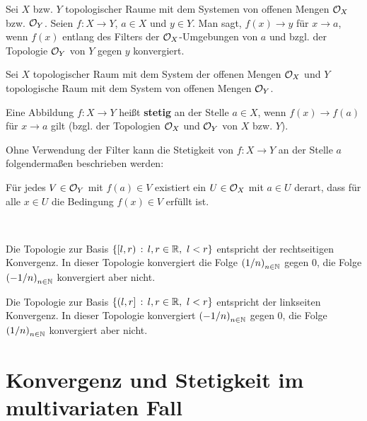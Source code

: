 \begin{defn}
	Sei $X$ bzw. $Y$ topologischer Raume mit dem Systemen von offenen Mengen $\mathcal{O}_X$ bzw. $\mathcal{O}_Y$. Seien $ f:  X \to Y$, $a \in X$ und $y \in Y$. Man sagt,  $f(x) \to y$ für $x \to a$, wenn $f(x)$ entlang des Filters der $\mathcal{O}_X$-Umgebungen von $a$ und bzgl. der Topologie $\mathcal{O}_Y$ von $Y$ gegen $y$ konvergiert. 
\end{defn} 

\begin{defn}
	Sei $X$ topologischer Raum mit dem System der offenen Mengen $\mathcal{O}_X$ und $Y$ topologische Raum mit dem System von offenen Mengen $\mathcal{O}_Y$. 
	
	Eine Abbildung $ f: X \to Y$ heißt \textbf{stetig} an der Stelle $a \in X$, wenn $f(x) \to f(a)$ für $x \to a$ gilt (bzgl. der Topologien $\mathcal{O}_X$ und $\mathcal{O}_Y$ von $X$ bzw. $Y$). 
\end{defn} 

\begin{bem}
	Ohne Verwendung der Filter kann die Stetigkeit von $f : X \to Y$ an der Stelle $a$ folgendermaßen beschrieben werden: 
	
		 Für jedes $V \in \mathcal{O}_Y$ mit $f(a) \in V$ existiert ein $U \in \mathcal{O}_X$ mit $a \in U$ derart, dass für alle $x \in U$ die Bedingung $f(x) \in V$ erfüllt ist. 
\end{bem} 

\begin{bem} { \ } 
	\begin{enuma}
		\item Die Topologie zur Basis $\left\{  [l,r)  \,:\, l,r \in \mathbb{R}, \ l < r \right\}$ entspricht der rechtseitigen Konvergenz. In dieser Topologie konvergiert die Folge $\left(1/n \right)_{n \in \mathbb{N}}$ gegen $0$, die Folge $\left( - 1/n \right)_{n \in \mathbb{N}}$ konvergiert aber nicht. 
	
		\item Die Topologie zur Basis $\left\{  (l,r]  \,:\, l,r \in \mathbb{R}, \ l < r \right\}$ entspricht der linkseiten Konvergenz. In dieser Topologie konvergiert $\left(-1/n \right)_{n \in \mathbb{N}}$ gegen $0$, die Folge $\left( 1/n \right)_{n \in \mathbb{N}}$ konvergiert aber nicht.
	\end{enuma} 
\end{bem} 


\section{Konvergenz und Stetigkeit im multivariaten Fall} 

